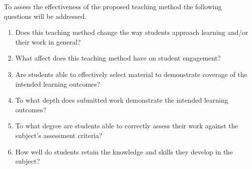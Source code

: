 To assess the effectiveness of the proposed teaching method the following questions will be addressed.

\begin{enumerate}
  \item Does this teaching method change the way students approach learning and/or their work in general?
  \item What affect does this teaching method have on student engagement?
  \item Are students able to effectively select material to demonstrate coverage of the intended learning outcomes?
  \item To what depth does submitted work demonstrate the intended learning outcomes?
  \item To what degree are students able to correctly assess their work against the subject's assessment criteria?
  \item How well do students retain the knowledge and skills they develop in the subject?
\end{enumerate}

